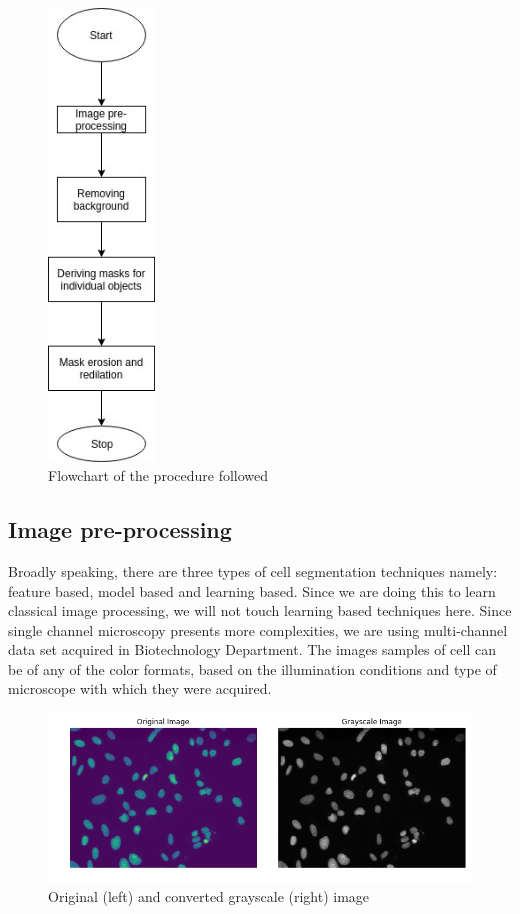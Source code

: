 \documentclass[letterpaper, 10 pt, conference]{ieeeconf}
\begin{document}
\begin{figure}
\centering
\includegraphics[height=12cm, width=.5\linewidth]{flw.jpg}
\caption{Flowchart of the procedure followed}
\label{fig:FMI_Cancer_Cell_Line}
\end{figure}

\subsection{Image pre-processing}
Broadly speaking, there are three types of cell segmentation techniques namely: feature based, model based and learning based. Since we are doing this to learn classical image processing, we will not touch learning based techniques here.
Since single channel microscopy presents more complexities, we are using multi-channel data set acquired in Biotechnology Department. The images samples of cell can be of any of the color formats, based on the illumination conditions and type of microscope with which they were acquired. 

\begin{figure}
\centering
\includegraphics[width=.9\linewidth]{original_n_greyscale.png}
\caption{Original (left) and converted grayscale (right) image}
\label{fig:greyscale}
\end{figure}
 
\end{document}
